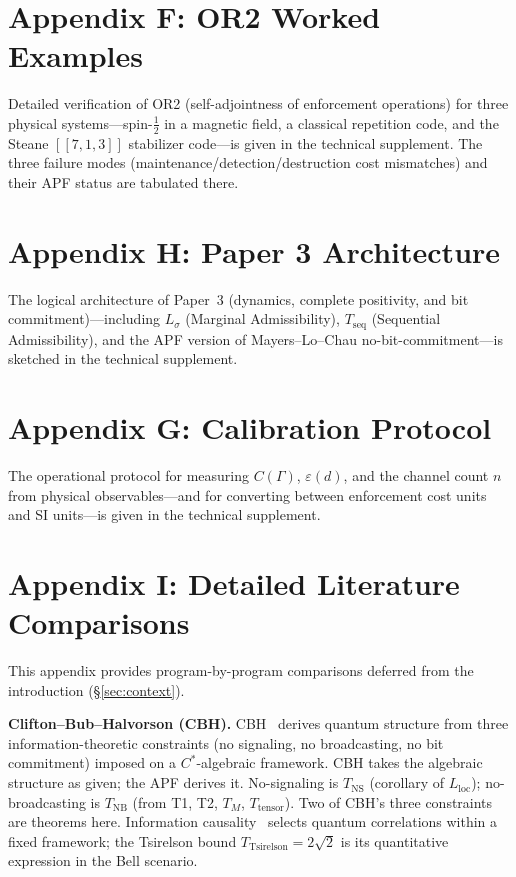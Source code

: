 \documentclass[11pt]{article}
\theoremstyle{remark}
\begin{document}
\section*{Appendix F: OR2 Worked Examples}

Detailed verification of OR2 (self-adjointness of enforcement operations) for three physical systems---spin-$\frac{1}{2}$ in a magnetic field, a classical repetition code, and the Steane $[\![7,1,3]\!]$ stabilizer code---is given in the technical supplement.  The three failure modes (maintenance/detection/destruction cost mismatches) and their APF status are tabulated there.

\section*{Appendix H: Paper 3 Architecture}

The logical architecture of Paper~3 (dynamics, complete positivity, and bit commitment)---including $L_\sigma$ (Marginal Admissibility), $T_{\mathrm{seq}}$ (Sequential Admissibility), and the APF version of Mayers--Lo--Chau no-bit-commitment---is sketched in the technical supplement.

\section*{Appendix G: Calibration Protocol}

The operational protocol for measuring $C(\Gamma)$, $\varepsilon(d)$, and the channel count $n$ from physical observables---and for converting between enforcement cost units and SI units---is given in the technical supplement.

\section*{Appendix I: Detailed Literature Comparisons}
\label{app:literature}

This appendix provides program-by-program comparisons deferred from the introduction (\S\ref{sec:context}).

\smallskip\noindent\textbf{Clifton--Bub--Halvorson (CBH).}  CBH~\cite{CBH2003} derives quantum structure from three information-theoretic constraints (no signaling, no broadcasting, no bit commitment) imposed on a $C^*$-algebraic framework.  CBH takes the algebraic structure as given; the APF derives it.  No-signaling is $T_{\mathrm{NS}}$ (corollary of $L_{\mathrm{loc}}$); no-broadcasting is $T_{\mathrm{NB}}$ (from T1, T2, $T_M$, $T_{\mathrm{tensor}}$).  Two of CBH's three constraints are theorems here.  Information causality~\cite{Pawlowski2009} selects quantum correlations within a fixed framework; the Tsirelson bound $T_{\mathrm{Tsirelson}} = 2\sqrt{2}$ is its quantitative expression in the Bell scenario.
\end{document}
